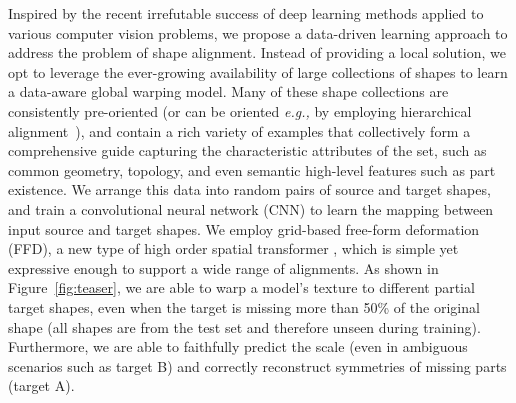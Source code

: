 \documentclass[acmtog,timestamp]{acmart}%
\begin{document}
Inspired by the recent irrefutable success of deep learning methods applied to various computer vision problems, we propose a data-driven learning approach to address the problem of  shape alignment. Instead of providing a local solution, we opt to leverage the ever-growing availability of large collections of shapes to learn a data-aware global warping model. Many of these shape collections are consistently pre-oriented (or can be oriented \emph{e.g.,} by employing hierarchical alignment~\cite{shapenet2015}), and contain a rich variety of examples that collectively form a comprehensive guide capturing the characteristic attributes of the set, such as common geometry, topology, and even semantic high-level features such as part existence.
We arrange this data into random pairs of source and target shapes, and train a convolutional neural network (CNN) to learn the mapping between input source and target shapes.
We employ grid-based free-form deformation (FFD), a new type of high order spatial transformer , which is simple yet expressive enough to support a wide range of alignments.
As shown in Figure~\ref{fig:teaser}, we are able to warp a model's texture to different partial target shapes, even when the target is missing more than 50\% of the original shape (all shapes are from the test set and therefore unseen during training). Furthermore, we are able to faithfully predict the scale (even in ambiguous scenarios such as target B) and correctly reconstruct symmetries of missing parts (target A).

\end{document}
